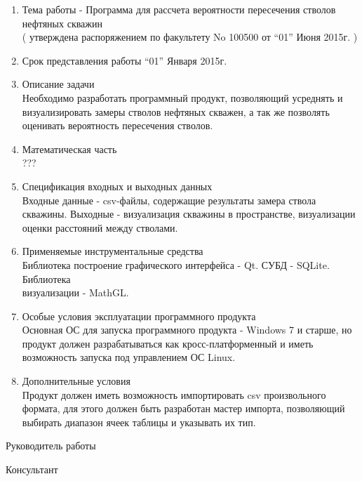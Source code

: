 \begin{titlepage}
\begin{enumerate}
  \item Тема работы - Программа для рассчета вероятности пересечения стволов нефтяных скважин\\
  ( утверждена распоряжением по факультету No 100500 от “01” Июня 2015г. )
  \item Срок представления работы “01” Января 2015г.
  \item Описание задачи\\
    Необходимо разработать программный продукт, позволяющий усреднять и визуализировать замеры стволов нефтяных скважен, а так же
    позволять оценивать вероятность пересечения стволов.
  \item Математическая часть\\
  ???
  \item Спецификация входных и выходных данных\\
  Входные данные - csv-файлы, содержащие результаты замера ствола скважины. Выходные - визуализация скважины в пространстве, визуализации оценки расстояний
  между стволами.
  \item Применяемые инструментальные средства\\
  Библиотека построение графического интерфейса - Qt. СУБД - SQLite. Библиотека\\визуализации - MathGL.
  \item Особые условия эксплуатации программного продукта\\
  Основная ОС для запуска программного продукта - Windows 7 и старше, но продукт должен разрабатываться как кросс-платформенный и иметь возможность запуска
  под управлением ОС Linux.
  \item Дополнительные условия\\
  Продукт должен иметь возможность импортировать csv произвольного формата, для этого должен быть разработан мастер импорта, позволяющий
  выбирать диапазон ячеек таблицы и указывать их тип.
\end{enumerate}

\vspace{\fill}

Руководитель работы \underline{\hspace{5cm}}

Консультант \underline{\hspace{6.5cm}}
\end{titlepage}
